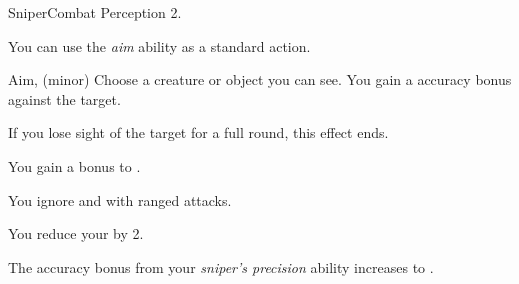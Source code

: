     \begin{feat}{Sniper}{Combat}
        \featpre Perception 2.

         You can use the \textit{aim} ability as a standard action.
        \begin{sustainability}{Aim}{,  (minor)}
            \rankline
            Choose a creature or object you can see.
            You gain a  accuracy bonus against the target.

            If you lose sight of the target for a full round, this effect ends.
        \end{sustainability}

         You gain a  bonus to .

         You ignore  and  with ranged attacks.

         You reduce your  by 2.

         The accuracy bonus from your \textit{sniper's precision} ability increases to .
    \end{feat}

